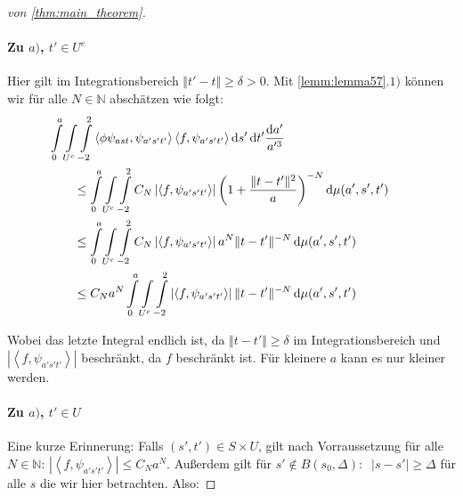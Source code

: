\begin{proof}[von \ref{thm:main_theorem}]
\paragraph*{Zu $a)$, $t' \in U^c$}
Hier gilt im Integrationsbereich $\Vert t' - t \Vert \geq \delta > 0$. Mit \cref{lemm:lemma57}$.1)$ können wir für alle $N\in \mathbb{N}$ abschätzen wie folgt:
\begin{align*}
 &\kern-2em
 \int\limits_{0}^{a} \int\limits_{U^c} \int\limits_{-2}^2
 \left\langle \phi \psi_{ast}, \psi_{a's't'} \right\rangle
 \left\langle f, \psi_{a's't'} \right\rangle
    \d s' \d t' \frac{\d a'}{a^{\prime 3}}
\\&\leq
\int\limits_{0}^{a} \int\limits_{U^c} \int\limits_{-2}^2
C_N
\left| \left\langle f, \psi_{a's't'} \right\rangle \right|
\left(1+\frac{\Vert t-t' \Vert^2}{a}\right)^{-N} \d \mu(a',s',t')
\\&\leq
\int\limits_{0}^{a} \int\limits_{U^c} \int\limits_{-2}^2
C_N
\left| \left\langle f, \psi_{a's't'} \right\rangle \right|
a^N \Vert t-t' \Vert^{-N} \d \mu(a',s',t')
\\&\leq
C_N a^N
\int\limits_{0}^{a} \int\limits_{U^c} \int\limits_{-2}^2
\left| \left\langle f, \psi_{a's't'} \right\rangle \right|
\Vert t-t' \Vert^{-N} \d \mu(a',s',t')
\end{align*}

Wobei das letzte Integral endlich ist, da $\Vert t-t'\Vert \geq \delta$ im Integrationsbereich und $\left| \left\langle f, \psi_{a's't'} \right\rangle \right|$ beschränkt, da $f$ beschränkt ist. Für kleinere $a$ kann es nur kleiner werden.


\paragraph*{Zu $a)$, $t' \in U$}
Eine kurze Erinnerung: Falls $(s',t') \in S \times U$, gilt nach Vorraussetzung für alle $N \in \mathbb{N}$:
$\left| \left\langle f, \psi_{a's't'} \right\rangle \right| \leq C_N a^N$.
Außerdem gilt für $s' \notin B(s_0,\Delta) : ~$ $|s-s'|  \geq \Delta$ für alle $s$ die wir hier betrachten. Also:


\end{proof}
